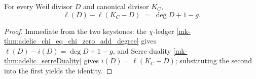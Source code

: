\begin{theorem}
  \label{mk-thm:adelic_riemannRoch}
  \notready
  For every Weil divisor \(D\) and canonical divisor \(K_C\),
  \[
    \ell(D) - \ell(K_C - D) \;=\; \deg D + 1 - g .
  \]
\end{theorem}
\begin{proof}
  Immediate from the two keystones: the \(\chi\)-ledger
  \ref{mk-thm:adelic_chi_eq_chi_zero_add_degree} gives
  \(\ell(D) - i(D) = \deg D + 1 - g\), and Serre duality
  \ref{mk-thm:adelic_serreDuality} gives \(i(D) = \ell(K_C - D)\);
  substituting the second into the first yields the identity.
\end{proof}
